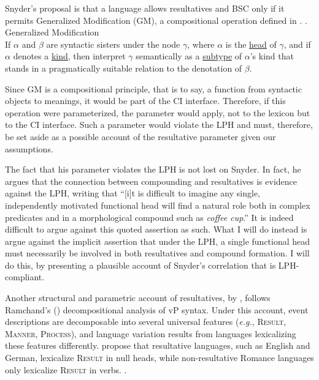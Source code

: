Snyder's proposal is that a language allows resultatives and BSC only if it permits Generalized Modification (GM), a compositional operation defined in \Next.
\ex. Generalized Modification \parencite{snyder2012parameter}\\
If $\alpha$ and $\beta$ are syntactic sisters under the node $\gamma$, where $\alpha$ is the \uline{head} of $\gamma$, and if $\alpha$ denotes a \uline{kind}, then interpret $\gamma$ semantically as a \uline{subtype} of $\alpha$'s kind that stands in a pragmatically suitable relation to the denotation of $\beta$.

Since GM is a compositional principle, that is to say, a function from syntactic objects to meanings, it would be part of the CI interface.
Therefore, if this operation were parameterized, the parameter would apply, not to the lexicon but to the CI interface.
Such a parameter would violate the LPH and must, therefore, be set aside as a possible account of the resultative parameter given our assumptions.

The fact that his parameter violates the LPH is not lost on Snyder.
In fact, he argues that the connection between compounding and resultatives is evidence against the LPH, writing that ``[i]t is difficult to imagine any single, independently motivated functional head will find a natural role both in complex predicates and in a morphological compound such as \textit{coffee cup}.'' \parencite[62]{snyder1995language}
It is indeed difficult to argue against this quoted assertion as such.
What I will do instead is argue against the implicit assertion that under the LPH, a single functional head must necessarily be involved in both resultatives and compound formation.
I will do this, by presenting a plausible account of Snyder's correlation that is LPH-compliant.

Another structural and parametric account of resultatives, by \textcite{son2008microparameters}, follows Ramchand's (\citeyear{ramchand2008verb}) decompositional analysis of vP syntax.
Under this account, event descriptions are decomposable into several universal features (\textit{e.g.}, \textsc{Result}, \textsc{Manner}, \textsc{Process}), and language variation results from languages lexicalizing these features differently.
\textcite{son2008microparameters} propose that resultative languages, such as English and German, lexicalize \textsc{Result} in null heads, while non-resultative Romance languages only lexicalize \textsc{Result} in verbs.
\ex.

